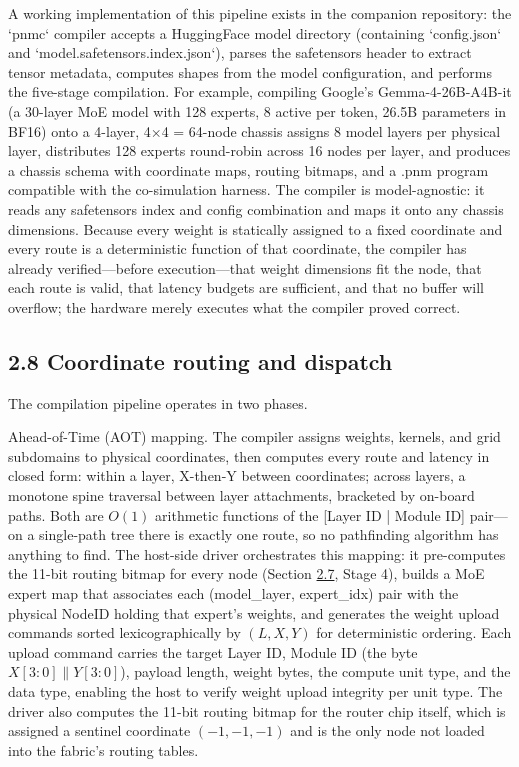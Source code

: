 \documentclass[10pt,twocolumn]{article}
\begin{document}
A working implementation of this pipeline exists in the companion repository: the `pnmc` compiler accepts a HuggingFace model directory (containing `config.json` and `model.safetensors.index.json`), parses the safetensors header to extract tensor metadata, computes shapes from the model configuration, and performs the five-stage compilation. For example, compiling Google's Gemma-4-26B-A4B-it (a 30-layer MoE model with 128 experts, 8 active per token, 26.5B parameters in BF16) onto a 4-layer, 4$\times$4 = 64-node chassis assigns 8 model layers per physical layer, distributes 128 experts round-robin across 16 nodes per layer, and produces a chassis schema with coordinate maps, routing bitmaps, and a .pnm program compatible with the co-simulation harness. The compiler is model-agnostic: it reads any safetensors index and config combination and maps it onto any chassis dimensions. Because every weight is statically assigned to a fixed coordinate and every route is a deterministic function of that coordinate, the compiler has already verified---before execution---that weight dimensions fit the node, that each route is valid, that latency budgets are sufficient, and that no buffer will overflow; the hardware merely executes what the compiler proved correct.

\subsection*{2.8 Coordinate routing and dispatch}\label{sec:2.8}

The compilation pipeline operates in two phases.

Ahead-of-Time (AOT) mapping. The compiler assigns weights, kernels, and grid subdomains to physical coordinates, then computes every route and latency in closed form: within a layer, X-then-Y between coordinates; across layers, a monotone spine traversal between layer attachments, bracketed by on-board paths. Both are $O(1)$ arithmetic functions of the [Layer ID | Module ID] pair---on a single-path tree there is exactly one route, so no pathfinding algorithm has anything to find. The host-side driver orchestrates this mapping: it pre-computes the 11-bit routing bitmap for every node (Section \hyperref[sec:2.7]{2.7}, Stage 4), builds a MoE expert map that associates each (model\_layer, expert\_idx) pair with the physical NodeID holding that expert's weights, and generates the weight upload commands sorted lexicographically by $(L, X, Y)$ for deterministic ordering. Each upload command carries the target Layer ID, Module ID (the byte $X[3:0] \parallel Y[3:0]$), payload length, weight bytes, the compute unit type, and the data type, enabling the host to verify weight upload integrity per unit type. The driver also computes the 11-bit routing bitmap for the router chip itself, which is assigned a sentinel coordinate $(-1, -1, -1)$ and is the only node not loaded into the fabric's routing tables.
\end{document}

